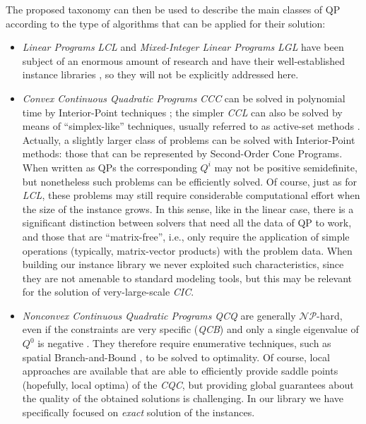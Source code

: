 The proposed taxonomy can then be used to describe the main classes of QP according to the type of algorithms that can be applied for their solution:
%
\begin{itemize}
 \item \emph{Linear Programs} \textit{LCL} and \emph{Mixed-Integer Linear Programs} \textit{LGL} have been subject of an enormous amount of research and have their well-established instance libraries \cite{Koch2011}, so they will not be explicitly addressed here.
 \item \emph{Convex Continuous Quadratic Programs} \textit{CCC} can be solved in polynomial time by Interior-Point techniques \cite{Wright97}; the simpler \textit{CCL} can also be solved by means of ``simplex-like'' techniques, usually referred to as active-set methods \cite{Dost09}. Actually, a slightly larger class of problems can be solved with Interior-Point methods: those that can be represented by Second-Order Cone Programs. When written as QPs the corresponding $Q^i$ may not be positive semidefinite, but nonetheless such problems can be efficiently solved. Of course, just as for \textit{LCL}, these problems may still require considerable computational effort when the size of the instance grows. In this sense, like in the linear case, there is a significant distinction between solvers that need all the data of QP to work, and those that are ``matrix-free'', i.e., only require the application of simple operations (typically, matrix-vector products) with the problem data. When building our instance library we never exploited such characteristics, since they are not amenable to standard modeling tools, but this may be relevant for the solution of very-large-scale \textit{CIC}.
 \item \emph{Nonconvex Continuous Quadratic Programs} \textit{QCQ} are generally $\mathcal{NP}$-hard, even if the constraints are very specific (\textit{QCB}) and only a single eigenvalue of $Q^0$ is negative \cite{Hemmecke2010}. They therefore require enumerative techniques, such as spatial Branch-and-Bound \cite{FV90,BeLeLiMaWa08}, to be solved to optimality. Of course, local approaches are available that are able to efficiently provide saddle points (hopefully, local optima) of the \textit{CQC}, but providing global guarantees about the quality of the obtained solutions is challenging. In our library we have specifically focused on  \emph{exact} solution of the instances.

\end{itemize}
